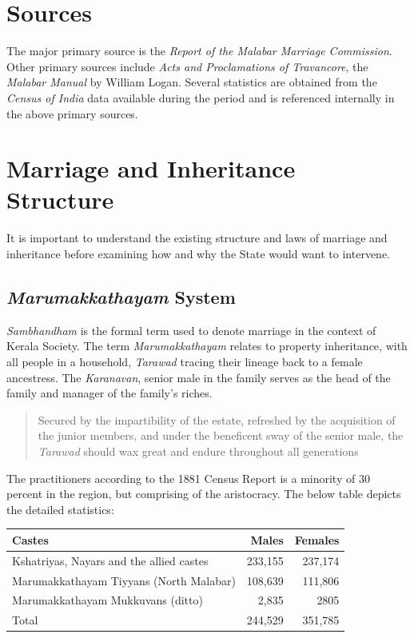 \documentclass[a4paper]{article}
\begin{document}
\section{Sources}

The major primary source is the \emph{Report of
the Malabar Marriage Commission}. Other primary
sources include \emph{Acts and Proclamations of
Travancore}, the \emph{Malabar Manual} by William
Logan.  Several statistics are obtained from the
\emph{Census of India} data available during the
period and is referenced internally in the above
primary sources.


\section{Marriage and Inheritance Structure} 

It is important to understand the existing
structure and laws of marriage and inheritance
before examining how and why the State would want
to intervene. 
\subsection{\emph{Marumakkathayam} System}
\emph{Sambhandham} is the formal term used to
denote marriage in the context of Kerala Society.
The term \emph{Marumakkathayam} relates to property
inheritance, with all people in a household,
\emph{Tarawad} tracing their lineage back to a
female ancestress\cite[51]{menon1894report}.
The \emph{Karanavan}, senior male in the family
serves as the head of the family and manager of
the family's riches.

\blockquote[{\cite[51]{menon1894report}}]{
    Secured by the impartibility of the estate,
    refreshed by the acquisition of the junior
    members, and under the beneficent sway of the
    senior male, the \emph{Tarawad} should wax
    great and endure throughout all generations 
}

The practitioners according to the 1881 Census
Report is a minority of 30 percent in the region, but
comprising of the
aristocracy\cite[7]{menon1894report}. The below
table depicts the detailed statistics:

\begin{center}
\begin{tabular}{l r r}
    Castes & Males & Females\\
    \hline
    Kshatriyas, Nayars and the allied castes &
    233,155 & 237,174\\
    Marumakkathayam Tiyyans (North Malabar) &
    108,639 & 111,806\\
    Marumakkathayam Mukkuvans (ditto) & 2,835 &
    2805 \\
    \hline
    Total & 244,529 & 351,785\\
    \hline
\end{tabular}
\end{center}
\end{document}
